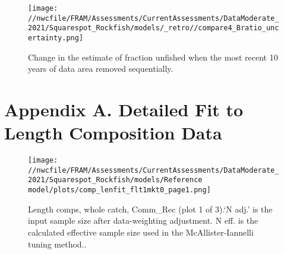 \documentclass[11pt,
  english,
  a4paper,
]{article}
\begin{document}
\tagmcend\tagstructend


\begin{figure}
\centering
\texttt{[image: //nwcfile/FRAM/Assessments/CurrentAssessments/DataModerate\_2021/Squarespot\_Rockfish/models/\_retro//compare4\_Bratio\_uncertainty.png]}
\caption{Change in the estimate of fraction unfished when the most recent 10 years of data area removed sequentially.\label{fig:retro-depl}}
\end{figure}

\tagmcend\tagstructend

\newpage

\clearpage


\hypertarget{appendix-a.-detailed-fit-to-length-composition-data}{%
\section{Appendix A. Detailed Fit to Length Composition Data}\label{appendix-a.-detailed-fit-to-length-composition-data}}

\leavevmode\tagmcend\tagstructend


\begin{figure}
\centering
\texttt{[image: //nwcfile/FRAM/Assessments/CurrentAssessments/DataModerate\_2021/Squarespot\_Rockfish/models/Reference model/plots/comp\_lenfit\_flt1mkt0\_page1.png]}
\caption{Length comps, whole catch, Comm\_Rec (plot 1 of 3).`N adj.' is the input sample size after data-weighting adjustment. N eff. is the calculated effective sample size used in the McAllister-Iannelli tuning method..\label{fig:comp_lenfit_flt1mkt0_page1}}
\end{figure}

\tagmcend\tagstructend

\end{document}
